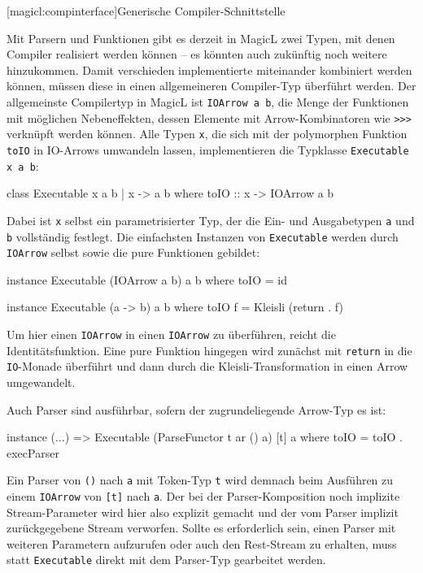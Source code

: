 \documentclass[12pt, a4paper, bibgerm]{scrbook}
\newenvironment{DIFnomarkup}{}{}
\newcommand\icode[1]{\lstinline?#1?}
\newcommand\lsection{}
\begin{document}
\lsection[magicl:compinterface]{Generische Compiler-Schnittstelle}

Mit Parsern und Funktionen gibt es derzeit in MagicL zwei Typen, mit
denen Compiler realisiert werden können -- es könnten auch zukünftig
noch weitere hinzukommen. Damit verschieden implementierte miteinander
kombiniert werden können, müssen diese in einen allgemeineren
Compiler-Typ überführt werden. Der allgemeinste Compilertyp in MagicL
ist \icode{IOArrow a b}, die Menge der Funktionen mit möglichen
Nebeneffekten, dessen Elemente mit Arrow-Kombinatoren wie \icode{>>>}
verknüpft werden können. Alle Typen \icode{x}, die sich mit der
polymorphen Funktion \icode{toIO} in IO-Arrows umwandeln lassen,
implementieren die Typklasse \icode{Executable x a b}:
\begin{DIFnomarkup}\begin{code}
class Executable x a b | x -> a b where
  toIO :: x -> IOArrow a b
\end{code}\end{DIFnomarkup}
Dabei ist \icode{x} selbst ein parametrisierter Typ, der die Ein- und
Ausgabetypen \icode{a} und \icode{b} vollständig festlegt. Die
einfachsten Instanzen von \icode{Executable} werden durch \icode{IOArrow}
selbst sowie die pure Funktionen gebildet:
\begin{DIFnomarkup}\begin{code}
instance Executable (IOArrow a b) a b where
  toIO = id

instance Executable (a -> b) a b where
  toIO f = Kleisli (return . f)
\end{code}\end{DIFnomarkup}
Um hier einen \icode{IOArrow} in einen \icode{IOArrow} zu überführen,
reicht die Identitätsfunktion. Eine pure Funktion hingegen wird zunächst
mit \icode{return} in die \icode{IO}-Monade überführt und dann durch die
Kleisli-Transformation in einen Arrow umgewandelt.

Auch Parser sind ausführbar, sofern der zugrundeliegende Arrow-Typ es
ist:
\begin{DIFnomarkup}\begin{code}
instance (...) => Executable (ParseFunctor t ar () a) [t] a where
  toIO = toIO . execParser
\end{code}\end{DIFnomarkup}
Ein Parser von \icode{()} nach \icode{a} mit Token-Typ \icode{t} wird
demnach beim Ausführen zu einem \icode{IOArrow} von \icode{[t]} nach
\icode{a}. Der bei der Parser-Komposition noch implizite
Stream-Parameter wird hier also explizit gemacht und der vom Parser
implizit zurückgegebene Stream verworfen. Sollte es erforderlich
sein, einen Parser mit weiteren Parametern aufzurufen oder auch den
Rest-Stream zu erhalten, muss statt \icode{Executable} direkt mit dem
Parser-Typ gearbeitet werden.
\end{document}
